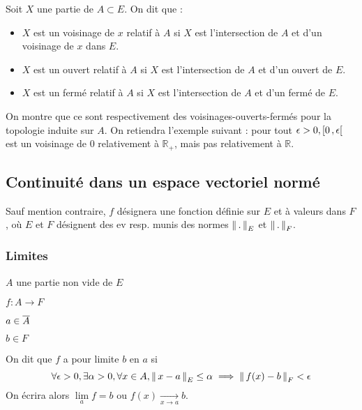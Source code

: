     \begin{defi}{}{}
        Soit $X$ une partie de $A \subset E$. On dit que : 
        \begin{itemize}
            \item $X$ est un voisinage de $x$ relatif à $A$ si $X$ est l’intersection de $A$ et d’un voisinage de $x$ dans $E$.
            \item $X$ est un ouvert relatif à $A$ si $X$ est l’intersection de $A$ et d’un ouvert de $E$.
            \item $X$ est un fermé relatif à $A$ si $X$ est l’intersection de $A$ et d’un fermé de $E$.
        \end{itemize}
    \end{defi}

    On montre que ce sont respectivement des voisinages-ouverts-fermés pour la topologie induite sur $A$. On retiendra l’exemple suivant : pour tout $\epsilon > 0, \left[ 0 \, , \epsilon \right[$ est un voisinage de $0$ relativement à $\mathbb{R}_+$, mais pas relativement à $\mathbb{R}$.

\subsection{Continuité dans un espace vectoriel normé}

    Sauf mention contraire, $f$ désignera une fonction définie sur $E$ et à valeurs dans $F$, où $E$ et $F$ désignent des ev resp. munis des normes $\left\lVert\,.\,\right\rVert_E$ et $\left\lVert\,.\,\right\rVert_F$.

    \subsubsection{Limites}

    \begin{defi}{}{}
        \begin{soient}
            \item $A$ une partie non vide de $E$ 
            \item $f : A \rightarrow F$
            \item $a \in \overline{A}$
            \item $b \in F$
        \end{soient}
        On dit que $f$ a pour limite $b$ en $a$ si 
        \[ \forall \epsilon > 0, \exists \alpha > 0, \forall x \in A, \left\lVert\,x-a\,\right\rVert_E \leq \alpha \implies \left\lVert\,f(x)-b\,\right\rVert_F < \epsilon \] 
        On écrira alors $\lim\limits_{a} f = b$ ou $f(x) \underset{x \rightarrow a}{\longrightarrow} b$.
    \end{defi}

